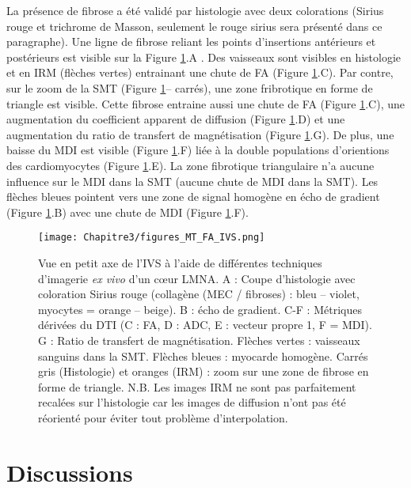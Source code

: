 La présence de fibrose a été validé par histologie avec deux colorations (Sirius rouge et trichrome de Masson, seulement le rouge sirius sera présenté dans ce paragraphe). Une ligne de fibrose reliant les points d’insertions antérieurs et postérieurs est visible sur la Figure \ref{fig:multimodale_LMNA}.A . Des vaisseaux sont visibles en histologie et en IRM (flèches vertes) entrainant une chute de FA (Figure \ref{fig:multimodale_LMNA}.C). Par contre, sur le zoom de la SMT (Figure \ref{fig:multimodale_LMNA}– carrés), une zone fribrotique en forme de triangle est visible. Cette fibrose entraine aussi une chute de FA (Figure \ref{fig:multimodale_LMNA}.C), une augmentation du coefficient apparent de diffusion (Figure \ref{fig:multimodale_LMNA}.D) et une augmentation du ratio de transfert de magnétisation (Figure \ref{fig:multimodale_LMNA}.G). De plus, une baisse du MDI est visible (Figure \ref{fig:multimodale_LMNA}.F) liée à la double populations d’orientions des cardiomyocytes (Figure \ref{fig:multimodale_LMNA}.E). La zone fibrotique triangulaire n’a aucune influence sur le MDI dans la SMT (aucune chute de MDI dans la SMT). Les flèches bleues pointent vers une zone de signal homogène en écho de gradient (Figure \ref{fig:multimodale_LMNA}.B) avec une chute de MDI (Figure \ref{fig:multimodale_LMNA}.F).

\begin{figure}[!ht]
  \begin{center}
    \texttt{[image: Chapitre3/figures\_MT\_FA\_IVS.png]}
  \end{center}
  \caption{Vue en petit axe de l’IVS à l’aide de différentes techniques d’imagerie \textit{ex vivo} d’un cœur LMNA. A : Coupe d’histologie avec coloration Sirius rouge (collagène (MEC / fibroses) : bleu – violet, myocytes = orange – beige). B : écho de gradient. C-F : Métriques dérivées du DTI (C : FA, D : ADC, E : vecteur propre 1, F = MDI). G : Ratio de transfert de magnétisation. Flèches vertes : vaisseaux sanguins dans la SMT. Flèches bleues : myocarde homogène. Carrés gris (Histologie) et oranges (IRM) : zoom sur une zone de fibrose en forme de triangle. N.B. Les images IRM ne sont pas parfaitement recalées sur l’histologie car les images de diffusion n’ont pas été réorienté pour éviter tout problème d’interpolation.}
  \label{fig:multimodale_LMNA}
\end{figure}

\clearpage
\section{Discussions}

